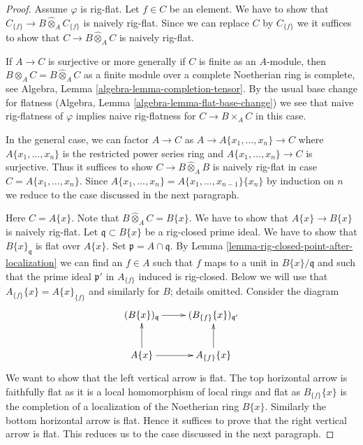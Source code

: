 \documentclass[10pt,a4paper]{amsart}
\theoremstyle{plain}
\theoremstyle{definition}
\theoremstyle{remark}
\numberwithin{equation}{subsection}
\begin{document}
\begin{proof}
Assume $\varphi$ is rig-flat. Let $f \in C$ be an element.
We have to show that
$C_{\{f\}} \to B \widehat{\otimes}_A C_{\{f\}}$
is naively rig-flat. Since we can replace $C$ by $C_{\{f\}}$
we it suffices to show that $C \to B \widehat{\otimes}_A C$
is naively rig-flat.

\medskip\noindent
If $A \to C$ is surjective or more generally if $C$ is finite as
an $A$-module, then $B \otimes_A C = B \widehat{\otimes}_A C$
as a finite module over a complete Noetherian ring is complete, see
Algebra, Lemma \ref{algebra-lemma-completion-tensor}.
By the usual base change for flatness
(Algebra, Lemma \ref{algebra-lemma-flat-base-change})
we see that naive rig-flatness of $\varphi$ implies naive rig-flatness
for $C \to B \times_A C$ in this case.

\medskip\noindent
In the general case, we can factor $A \to C$ as
$A \to A\{x_1, \ldots, x_n\} \to C$
where $A\{x_1, \ldots, x_n\}$ is the restricted power series ring
and $A\{x_1, \ldots, x_n\} \to C$ is surjective. Thus it
suffices to show $C \to B \widehat{\otimes}_A B$ is naively
rig-flat in case $C = A\{x_1, \ldots, x_n\}$.
Since $A\{x_1, \ldots, x_n\} = A\{x_1, \ldots, x_{n - 1}\}\{x_n\}$
by induction on $n$ we reduce to the case discussed in the next
paragraph.

\medskip\noindent
Here $C = A\{x\}$. Note that $B \widehat{\otimes}_A C = B\{x\}$.
We have to show that $A\{x\} \to B\{x\}$ is naively rig-flat.
Let $\mathfrak q \subset B\{x\}$ be a rig-closed prime ideal.
We have to show that $B\{x\}_{\mathfrak q}$ is flat over $A\{x\}$.
Set $\mathfrak p = A \cap \mathfrak q$.
By Lemma \ref{lemma-rig-closed-point-after-localization}
we can find an $f \in A$ such that
$f$ maps to a unit in $B\{x\}/\mathfrak q$ and such
that the prime ideal $\mathfrak p'$ in $A_{\{f\}}$ induced is rig-closed.
Below we will use that $A_{\{f\}}\{x\} = A\{x\}_{\{f\}}$ and similarly
for $B$; details omitted. Consider the diagram
$$
\xymatrix{
(B\{x\})_{\mathfrak q} \ar[r] &
(B_{\{f\}}\{x\})_{\mathfrak q'} \\
A\{x\} \ar[r] \ar[u] &
A_{\{f\}}\{x\} \ar[u]
}
$$
We want to show that the left vertical arrow is flat.
The top horizontal arrow is faithfully flat as it is a local
homomorphism of local rings and flat as $B_{\{f\}}\{x\}$
is the completion of a localization of the Noetherian ring
$B\{x\}$. Similarly the bottom horizontal arrow is flat.
Hence it suffices to prove that the right vertical arrow is flat.
This reduces us to the case discussed in the next paragraph.


\end{proof}
\end{document}

